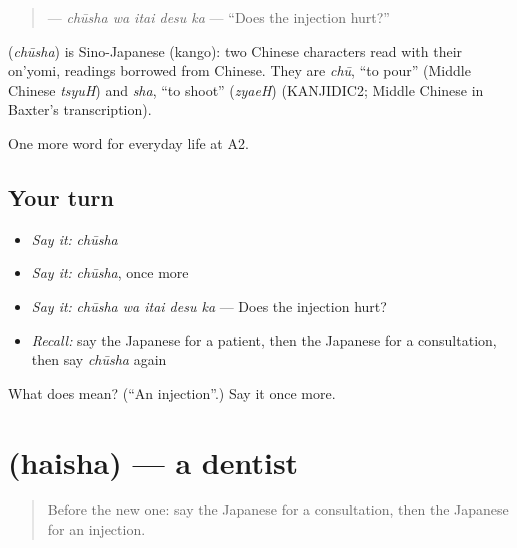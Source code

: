 \begin{quote}
\textbf{ } — \emph{chūsha wa itai desu ka} — \textquotedblleft{}Does the injection hurt?\textquotedblright{}
\end{quote}

\begin{cousinweb}
\textbf{} (\emph{chūsha}) is Sino-Japanese (kango): two Chinese characters read with their on'yomi, readings borrowed from Chinese. They are \emph{chū}, \textquotedblleft{}to pour\textquotedblright{} (Middle Chinese \emph{tsyuH}) and \emph{sha}, \textquotedblleft{}to shoot\textquotedblright{} (\emph{zyaeH}) (KANJIDIC2; Middle Chinese in Baxter's transcription).
\end{cousinweb}

\begin{grammarlens}[title={What you've built}]
One more word for everyday life at A2.
\end{grammarlens}

\subsection*{Your turn}
\begin{itemize}
\raggedright
  \item \emph{Say it:} \emph{chūsha}
  \item \emph{Say it:} \emph{chūsha}, once more
  \item \emph{Say it:} \emph{chūsha wa itai desu ka} — Does the injection hurt?
  \item \emph{Recall:} say the Japanese for a patient, then the Japanese for a consultation, then say \emph{chūsha} again
\end{itemize}

\begin{tcolorbox}[breakable,colback=teal!4,colframe=teal!35!black,title={Before you move on}]
What does  mean? (\textquotedblleft{}An injection\textquotedblright{}.) Say it once more.
\end{tcolorbox}
\section[\texorpdfstring{\ja{はいしゃ} (haisha)}{はいしゃ (haisha)}]{ (haisha) — a dentist}

\label{lesson:JA-C217-haisha}



\begin{quote}
Before the new one: say the Japanese for a consultation, then the Japanese for an injection.
\end{quote}

